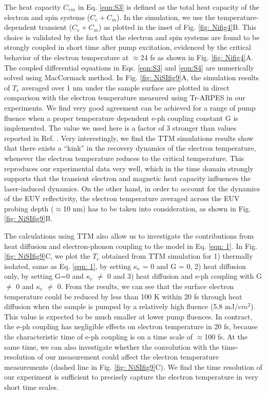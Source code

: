 The heat capacity $C_{em}$ in Eq. \ref{eqn:S3} is defined as the total heat capacity of the electron and spin systems ($C_e+C_m$). In the simulation, we use the temperature-dependent transient ($C_e+C_m$) as plotted in the inset of Fig. \ref{fig: Nifig4}B. This choice is validated by the fact that the electron and spin systems are found to be strongly coupled in short time after pump excitation, evidenced by the critical behavior of the electron temperature at $\approx$24 fs as shown in Fig. \ref{fig: Nifig4}A. The coupled differential equations in Eqs. \ref{eqn:S3} and \ref{eqn:S4} are numerically solved using MacCormack method. In Fig. \ref{fig: NiSIfig9}A, the simulation results of $T_e$ averaged over 1 nm under the sample surface are plotted in direct comparison with the electron temperature measured using Tr-ARPES in our experiments. We find very good agreement can be achieved for a range of pump fluence when a proper temperature dependent e-ph coupling constant G is implemented. The value we used here is a factor of 3 stronger than values reported in Ref. \cite{Lin2008}.  Very interestingly, we find the TTM simulations results show that there exists a “kink” in the recovery dynamics of the electron temperature, whenever the electron temperature reduces to the critical temperature. This reproduces our experimental data very well, which in the time domain strongly supports that the transient electron and magnetic heat capacity influences the laser-induced dynamics. On the other hand, in order to account for the dynamics of the EUV reflectivity, the electron temperature averaged across the EUV probing depth ($\approx$10 nm) has to be taken into consideration, as shown in Fig. \ref{fig: NiSIfig9}B.

The calculations using TTM also allow us to investigate the contributions from heat diffusion and electron-phonon coupling to the model in Eq. \ref{eqn: 1}. In Fig. \ref{fig: NiSIfig9}C, we plot the $T_e$ obtained from TTM simulation for 1) thermally isolated, same as Eq. \ref{eqn: 1}, by setting $\kappa_e$ = 0 and G = 0, 2) heat diffusion only, by setting G=0 and $\kappa_e$ $\neq$ 0 and 3) heat diffusion and e-ph coupling with G $\neq$ 0 and $\kappa_e$ $\neq$ 0. From the results, we can see that the surface electron temperature could be reduced by less than 100 K within 20 fs through heat diffusion when the sample is pumped by a relatively high fluence (5.8 mJ/c$m^2$). This value is expected to be much smaller at lower pump fluences. In contract, the e-ph coupling has negligible effects on electron temperature in 20 fs, because the characteristic time of e-ph coupling is on a time scale of $\approx$100 fs. At the same time, we can also investigate whether the convolution with the time-resolution of our measurement could affect the electron temperature measurements (dashed line in Fig. \ref{fig: NiSIfig9}C). We find the time resolution of our experiment is sufficient to precisely capture the electron temperature in very short time scales.

